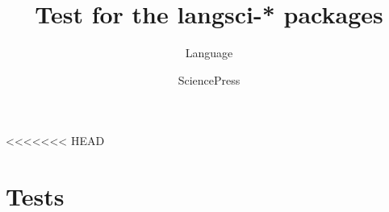 \documentclass[output=book
	      ,nonflat
	      ,modfonts
	      ]{langsci/langscibook}
\title{Test for the langsci-* packages}
\author{Language\and Science\lastand Press}
\begin{document}
<<<<<<< HEAD
\chapter{Tests} 
% 
% 
% 
% 
% 
% 
% 
% 
% 
% 
% 
% 
% 
% 
% 
% 

% 
% 
% 
% 
% 
% 
% 
% 
%   
% 
%  
% 
% 
\end{document}
